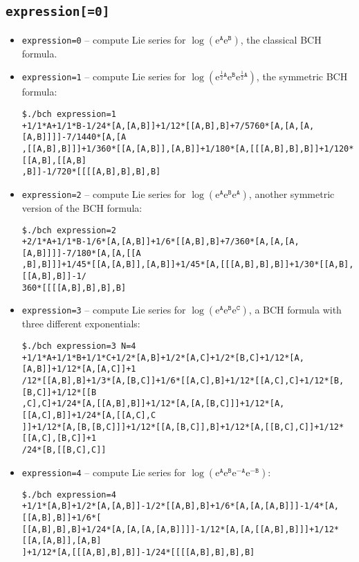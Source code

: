 \documentclass[11pt,a4paper]{article}
\newcommand{\ee}{\mathrm{e}}
\renewcommand{\AA}{\mathtt{A}}
\newcommand{\BB}{\mathtt{B}}
\newcommand{\CC}{\mathtt{C}}
\begin{document}
\subsection*{\tt expression[=0]}
\begin{itemize}[leftmargin=*]
\item {\tt expression=0} -- compute Lie series for $\log(\ee^\AA\ee^\BB)$, the classical BCH formula.
  \item {\tt expression=1} -- compute Lie series for $\log(\ee^{\frac{1}{2}\AA}\ee^\BB\ee^{\frac{1}{2}\AA})$, the symmetric BCH formula:

{\small\begin{BVerbatim}
$./bch expression=1
+1/1*A+1/1*B-1/24*[A,[A,B]]+1/12*[[A,B],B]+7/5760*[A,[A,[A,[A,B]]]]-7/1440*[A,[A
,[[A,B],B]]]+1/360*[[A,[A,B]],[A,B]]+1/180*[A,[[[A,B],B],B]]+1/120*[[A,B],[[A,B]
,B]]-1/720*[[[[A,B],B],B],B]
\end{BVerbatim}
}

\item {\tt expression=2} -- compute Lie series for $\log(\ee^\AA\ee^\BB\ee^\AA)$, another symmetric version of the BCH formula:

{\small\begin{BVerbatim}
$./bch expression=2
+2/1*A+1/1*B-1/6*[A,[A,B]]+1/6*[[A,B],B]+7/360*[A,[A,[A,[A,B]]]]-7/180*[A,[A,[[A
,B],B]]]+1/45*[[A,[A,B]],[A,B]]+1/45*[A,[[[A,B],B],B]]+1/30*[[A,B],[[A,B],B]]-1/
360*[[[[A,B],B],B],B]
\end{BVerbatim}
}

\item {\tt expression=3} -- compute Lie series for $\log(\ee^\AA\ee^\BB\ee^\CC)$, a BCH
formula with three different exponentials: 

{\small\begin{BVerbatim}
$./bch expression=3 N=4
+1/1*A+1/1*B+1/1*C+1/2*[A,B]+1/2*[A,C]+1/2*[B,C]+1/12*[A,[A,B]]+1/12*[A,[A,C]]+1
/12*[[A,B],B]+1/3*[A,[B,C]]+1/6*[[A,C],B]+1/12*[[A,C],C]+1/12*[B,[B,C]]+1/12*[[B
,C],C]+1/24*[A,[[A,B],B]]+1/12*[A,[A,[B,C]]]+1/12*[A,[[A,C],B]]+1/24*[A,[[A,C],C
]]+1/12*[A,[B,[B,C]]]+1/12*[[A,[B,C]],B]+1/12*[A,[[B,C],C]]+1/12*[[A,C],[B,C]]+1
/24*[B,[[B,C],C]]
\end{BVerbatim}
}

\item {\tt expression=4} -- compute Lie series for $\log(\ee^\AA\ee^\BB\ee^{-\AA}\ee^{-\BB})$:
    
{\small\begin{BVerbatim}
$./bch expression=4 
+1/1*[A,B]+1/2*[A,[A,B]]-1/2*[[A,B],B]+1/6*[A,[A,[A,B]]]-1/4*[A,[[A,B],B]]+1/6*[
[[A,B],B],B]+1/24*[A,[A,[A,[A,B]]]]-1/12*[A,[A,[[A,B],B]]]+1/12*[[A,[A,B]],[A,B]
]+1/12*[A,[[[A,B],B],B]]-1/24*[[[[A,B],B],B],B]
\end{BVerbatim}
}


\end{itemize}
\end{document}
